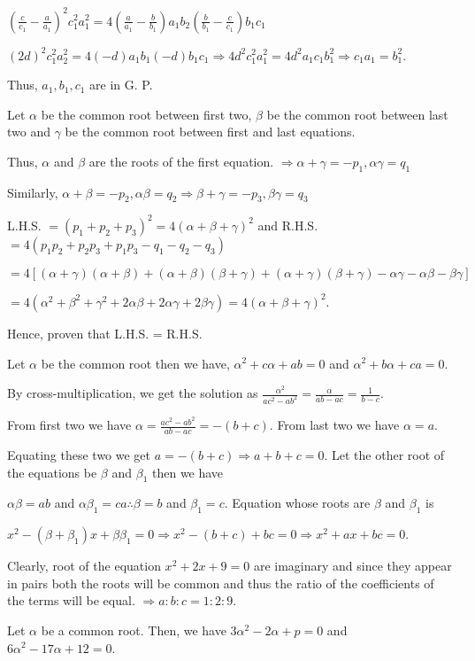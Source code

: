   $\left(\frac{c}{c_1} - \frac{a}{a_1}\right)^2c_1^2a_1^2 = 4\left(\frac{a}{a_1} -
  \frac{b}{b_1}\right)a_1b_2\left(\frac{b}{b_1} - \frac{c}{c_1}\right)b_1c_1$

  $(2d)^2c_1^2a_2^2 = 4(-d)a_1b_1(-d)b_1c_1\Rightarrow 4d^2c_1^2a_1^2 = 4d^2a_1c_1b_1^2 \Rightarrow c_1a_1 =
  b_1^2$.

  Thus, $a_1, b_1, c_1$ are in G. P.
\item Let $\alpha$ be the common root between first two, $\beta$ be the common root between last two and $\gamma$ be
  the common root between first and last equations.

  Thus, $\alpha$ and $\beta$ are the roots of the first equation. $\Rightarrow \alpha + \gamma = -p_1, \alpha\gamma = q_1$

  Similarly, $\alpha + \beta = -p_2, \alpha\beta = q_2\Rightarrow \beta + \gamma = -p_3, \beta\gamma = q_3$

  L.H.S. $= (p_1 + p_2 + p_3)^2 = 4(\alpha + \beta + \gamma)^2$ and R.H.S. $= 4(p_1p_2 + p_2p_3 + p_1p_3 - q_1 - q_2 - q_3)$

  $= 4[(\alpha + \gamma)(\alpha + \beta) + (\alpha + \beta)(\beta + \gamma) + (\alpha + \gamma)(\beta + \gamma) -
    \alpha\gamma - \alpha\beta - \beta\gamma]$

  $= 4(\alpha^2 + \beta^2 + \gamma^2 + 2\alpha\beta + 2\alpha\gamma + 2\beta\gamma) = 4(\alpha + \beta + \gamma)^2$.

  Hence, proven that L.H.S. = R.H.S.
\item Let $\alpha$ be the common root then we have, $\alpha^2 + c\alpha + ab = 0$ and $\alpha^2 + b\alpha + ca = 0$.

  By cross-multiplication, we get the solution as $\frac{\alpha^2}{ac^2 - ab^2} = \frac{\alpha}{ab - ac} =
  \frac{1}{b - c}$.

  From first two we have $\alpha = \frac{ac^2 - ab^2}{ab - ac} = -(b + c)$. From last two we have $\alpha = a$.

  Equating these two we get $a = -(b + c) \Rightarrow a + b + c = 0$. Let the other root of the equations be
  $\beta$ and $\beta_1$ then we have

  $\alpha\beta = ab$ and $\alpha\beta_1 = ca\therefore \beta = b$ and $\beta_1 = c$. Equation whose roots are
  $\beta$ and $\beta_1$ is

  $x^2 - (\beta + \beta_1)x + \beta\beta_1 = 0 \Rightarrow x^2 -(b + c) + bc = 0 \Rightarrow x^2 + ax + bc =
  0$.
\item Clearly, root of the equation $x^2 + 2x + 9 = 0$ are imaginary and since they appear in pairs both the
  roots will be common and thus the ratio of the coefficients of the terms will be equal. $\Rightarrow a :
  b: c = 1 : 2 : 9$.
\item Let $\alpha$ be a common root. Then, we have $3\alpha^2 -2\alpha + p = 0$ and $6\alpha^2 - 17\alpha + 12 = 0$.

